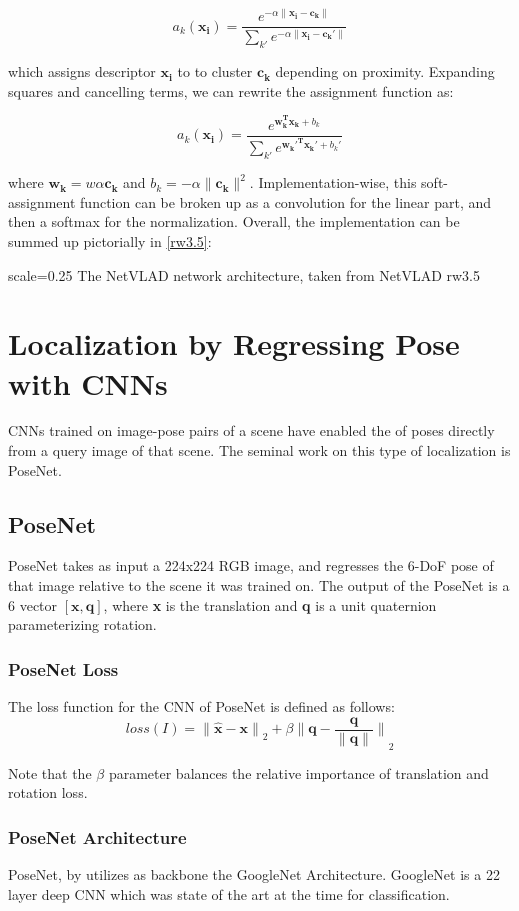 \[a_k(\mathbf{x_i}) = \frac{e^{-\alpha\|\mathbf{x_i - c_k}\|}}{\sum_{k'}e^{-\alpha\|\mathbf{x_i - c_k'}\|}}\]

which assigns descriptor $\mathbf{x_i}$ to to cluster $\mathbf{c_k}$ depending on proximity. Expanding squares and cancelling terms, we can rewrite the assignment
function as:

\[a_k(\mathbf{x_i}) = \frac{e^{\mathbf{w_k^T x_k} + b_k}}{\sum_{k'}e^{\mathbf{w_k'^T x_k'} + b_k'}}\]

where $\mathbf{w_k} = w\alpha\mathbf{c_k}$ and $b_k = -\alpha\|\mathbf{c_k}\|^2$. Implementation-wise, this soft-assignment function can be broken up as a convolution
for the linear part, and then a softmax for the normalization. Overall, the implementation can be summed up pictorially in \ref{rw3.5}:

{scale=0.25}%
{The NetVLAD network architecture, taken from \cite{Arandlejovic2015}}%
{NetVLAD}%
{rw3.5} %

\section{Localization by Regressing Pose with CNNs}
CNNs trained on image-pose pairs of a scene have enabled the  of poses directly from a query image of that scene. The seminal work on this type of localization is PoseNet.

\subsection{PoseNet}
PoseNet takes as input a 224x224 RGB image, and regresses the 6-DoF pose of that image relative to the scene it was trained on. The output of the PoseNet is a 6 vector $[\mathbf{x}, \mathbf{q}]$, where \textbf{x} is the translation and \textbf{q} is a unit quaternion parameterizing rotation. 

\subsubsection{PoseNet Loss}
The loss function for the CNN of PoseNet is defined as follows:
\[loss(I) = \mathbf{\|\hat{x} - x\|}_2 + \beta\mathbf{\|q - \dfrac{q}{\|q\|}\|}_2\]

Note that the $\beta$ parameter balances the relative importance of translation and rotation loss.

\subsubsection{PoseNet Architecture}
PoseNet, by \cite{Kendall2015} utilizes as backbone the GoogleNet Architecture. GoogleNet is a 22 layer deep CNN which was state of the art at the time for classification.


